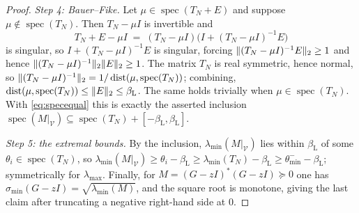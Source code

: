 \documentclass[11pt]{article}
\newcommand{\spec}{\operatorname{spec}}
\newcommand{\sigmin}{\sigma_{\min}}
\DeclarePairedDelimiter{\norm}{\lVert}{\rVert}
\begin{document}
\begin{proof}
\emph{Step 4: Bauer--Fike.} Let $\mu\in\spec(T_N+E)$ and suppose $\mu\notin\spec(T_N)$. Then
$T_N-\mu I$ is invertible and
\[
  T_N+E-\mu I\;=\;(T_N-\mu I)\big(I+(T_N-\mu I)^{-1}E\big)
\]
is singular, so $I+(T_N-\mu I)^{-1}E$ is singular, forcing
$\norm{(T_N-\mu I)^{-1}E}_2\ge1$ and hence $\norm{(T_N-\mu I)^{-1}}_2\norm{E}_2\ge1$. The matrix $T_N$
is real symmetric, hence normal, so $\norm{(T_N-\mu I)^{-1}}_2=1/\operatorname{dist}(\mu,\spec(T_N))$;
combining, $\operatorname{dist}(\mu,\spec(T_N))\le\norm{E}_2\le\beta_{\mathrm L}$. The same holds
trivially when $\mu\in\spec(T_N)$. With \eqref{eq:specequal} this is exactly the asserted inclusion
$\spec(M|_{\mathcal V})\subseteq\spec(T_N)+[-\beta_{\mathrm L},\beta_{\mathrm L}]$.

\emph{Step 5: the extremal bounds.} By the inclusion, $\lambda_{\min}(M|_{\mathcal V})$ lies within
$\beta_{\mathrm L}$ of some $\theta_i\in\spec(T_N)$, so
$\lambda_{\min}(M|_{\mathcal V})\ge\theta_i-\beta_{\mathrm L}\ge\lambda_{\min}(T_N)-\beta_{\mathrm L}
\ge\theta_{\min}^--\beta_{\mathrm L}$; symmetrically for $\lambda_{\max}$. Finally, for
$M=(G-zI)^*(G-zI)\succeq0$ one has $\sigmin(G-zI)=\sqrt{\lambda_{\min}(M)}$, and the square root is
monotone, giving the last claim after truncating a negative right-hand side at $0$.
\end{proof}
\end{document}
